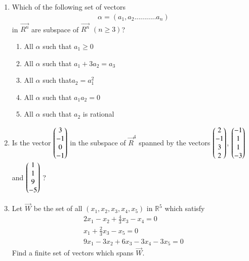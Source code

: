 \renewcommand{\theequation}{\theenumi}
\renewcommand{\thefigure}{\theenumi}
\begin{enumerate}[label=\thesubsection.\arabic*.,ref=\thesubsection.\theenumi]
%
\item Which of the following set of vectors
\begin{align}\alpha=(a_1,a_2...........a_n)\nonumber\end{align} in $\vec{R^n}$ are subspace of $\vec{R^n}$ $(n\geq3)$?\\
\begin{enumerate}
\item All $\alpha$ such that $a_1\geq0$\\
\item All $\alpha$ such that $a_1+3a_2=a_3$\\
\item All $\alpha$ such that$a_2=a_1^{2}$\\
\item All $\alpha$ such that $a_1a_2=0$\\
\item All $\alpha$ such that $a_2$ is rational
\end{enumerate}
%
\solution

\item Is the vector $\begin{pmatrix}3\\-1\\0\\-1\end{pmatrix}$ in the subspace of $\vec{R}^{4}$ spanned by the vectors $\begin{pmatrix}2\\-1\\3\\2\end{pmatrix}$, $\begin{pmatrix}-1\\1\\1\\-3\end{pmatrix}$ and $\begin{pmatrix}1\\1\\9\\-5\end{pmatrix}$ ?
%
\solution

%
\item  Let $\vec{W}$ be the set of all $(x_1,x_2,x_3,x_4,x_5)$ in $\mathbb{R}^5$ which satisfy
 \begin{align}
 2x_1-x_2+\frac{4}{3}x_3-x_4=0\\x_1+\frac{2}{3}x_3-x_5=0\\9x_1-3x_2+6x_3-3x_4-3x_5=0
 \end{align}
 Find a finite set of vectors which spans $\vec{W}$.


\end{enumerate}
